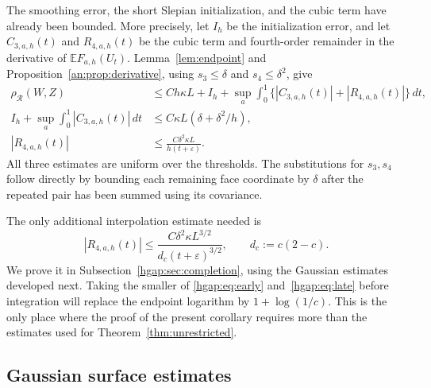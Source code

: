 \documentclass[11pt,letterpaper]{article}
\theoremstyle{remark}
\newcommand{\E}{\mathbb E}
\newcommand{\rh}{\rho_{\mathcal R}}
\newcommand{\dd}{\,d}
\begin{document}
The smoothing error, the short Slepian initialization, and the cubic
term have already been bounded. More precisely, let $I_h$ be the
initialization error, and let $C_{3,a,h}(t)$ and $R_{4,a,h}(t)$ be the
cubic term and fourth-order remainder in the derivative of
$\E F_{a,h}(U_t)$. Lemma~\ref{lem:endpoint} and
Proposition~\ref{an:prop:derivative}, using
$s_3\le\delta$ and $s_4\le\delta^2$, give
\begin{align}
 \rh(W,Z)&\le Ch\kappa L+I_h+
       \sup_a\int_0^1\{|C_{3,a,h}(t)|+|R_{4,a,h}(t)|\}\dd t,
                                             \label{hgap:eq:reduction}\\
 I_h+\sup_a\int_0^1|C_{3,a,h}(t)|\dd t
     &\le C\kappa L(\delta+\delta^2/h),        \label{hgap:eq:old-cubic}\\
 |R_{4,a,h}(t)|&\le\frac{C\delta^2\kappa L}{h(t+\varepsilon)}.
                                             \label{hgap:eq:early}
\end{align}
All three estimates are uniform over the thresholds. The substitutions
for $s_3,s_4$ follow directly by bounding each remaining face coordinate
by $\delta$ after the repeated pair has been summed using its covariance.

The only additional interpolation estimate needed is
\begin{equation}\label{hgap:eq:late}
 |R_{4,a,h}(t)|\le
 \frac{C\delta^2\kappa L^{3/2}}{d_c(t+\varepsilon)^{3/2}},
 \qquad d_c:=c(2-c).
\end{equation}
We prove it in Subsection~\ref{hgap:sec:completion}, using the Gaussian
estimates developed next. Taking the smaller of
\eqref{hgap:eq:early} and~\eqref{hgap:eq:late} before integration will
replace the endpoint logarithm by $1+\log(1/c)$. This is the only
place where the proof of the present corollary requires more than
the estimates used for Theorem~\ref{thm:unrestricted}.

\subsection{Gaussian surface estimates}\label{hgap:sec:surfaces}
\end{document}
